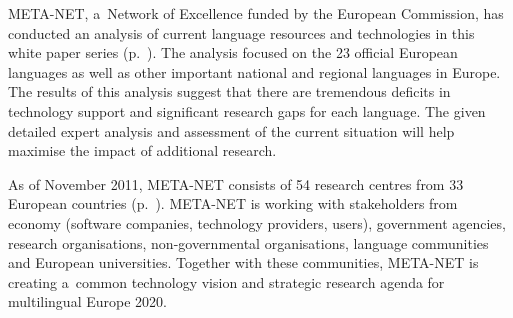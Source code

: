 \begin{Parallel}[c]{78 mm}{78 mm}
{META-NET, a~Network of Excellence funded by the European Commission,
has conducted an analysis of current language resources and
technologies in this white paper series
(p.~\pageref{whitepaperseries}). The analysis focused on the 23
official European languages as well as other important national and
regional languages in Europe. The results of this analysis suggest
that there are tremendous deficits in technology support and
significant research gaps for each language. The given detailed expert
analysis and assessment of the current situation will help maximise
the impact of additional research. 

As of November 2011, META-NET consists of 54 research centres from 33
European countries (p.~\pageref{metanetmembers}). META-NET is working
with stakeholders from economy (software companies, technology
providers, users), government agencies, research organisations,
non-governmental organisations, language communities and European
universities. Together with these communities, META-NET is creating
a~common technology vision and strategic research agenda for
multilingual Europe 2020.} \ParallelPar \end{Parallel} 

\makefundingnotice 


\cleardoublepage 


\renewcommand\contentsname{} \tableofcontents 



\cleardoublepage 

\setcounter{page}{1}  \pagestyle{scrheadings} 



